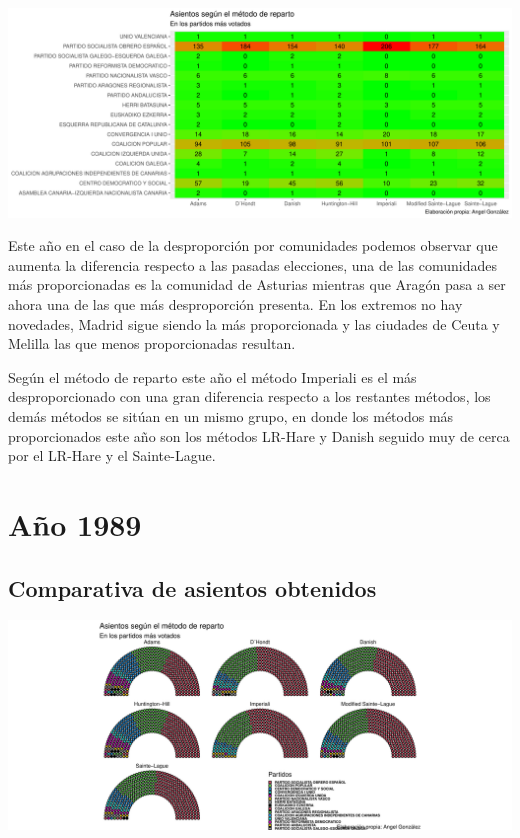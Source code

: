 \documentclass[12pt,a4paper,]{book}
\numberwithin{dummy}{section}
\theoremstyle{ocrenumbox}
\theoremstyle{blacknumex}
\theoremstyle{blacknumbox}
\theoremstyle{ocrenum}
\theoremstyle{ocrenum}
\begin{document}
\begin{center}\includegraphics[width=1\linewidth]{figurasR/unnamed-chunk-86-2} \end{center}

Este año en el caso de la desproporción por comunidades podemos observar
que aumenta la diferencia respecto a las pasadas elecciones, una de las
comunidades más proporcionadas es la comunidad de Asturias mientras que
Aragón pasa a ser ahora una de las que más desproporción presenta. En
los extremos no hay novedades, Madrid sigue siendo la más proporcionada
y las ciudades de Ceuta y Melilla las que menos proporcionadas resultan.

Según el método de reparto este año el método Imperiali es el más
desproporcionado con una gran diferencia respecto a los restantes
métodos, los demás métodos se sitúan en un mismo grupo, en donde los
métodos más proporcionados este año son los métodos LR-Hare y Danish
seguido muy de cerca por el LR-Hare y el Sainte-Lague.

\hypertarget{auxf1o-1989}{%
\section{Año 1989}\label{auxf1o-1989}}

\hypertarget{comparativa-de-asientos-obtenidos-4}{%
\subsection{Comparativa de asientos
obtenidos}\label{comparativa-de-asientos-obtenidos-4}}

\begin{center}\includegraphics[width=1\linewidth]{figurasR/unnamed-chunk-88-1} \end{center}
\end{document}
